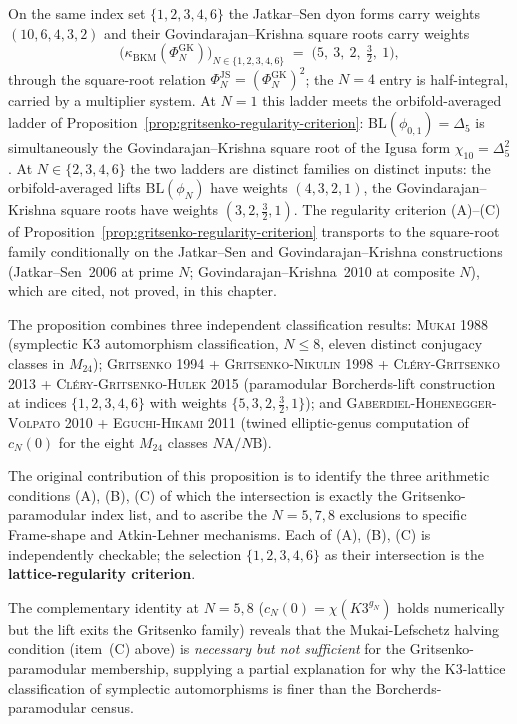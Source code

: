 \begin{corollary}
\label{cor:gritsenko-regularity-sqrt-transport}
On the same index set $\{1, 2, 3, 4, 6\}$ the Jatkar--Sen dyon forms
carry weights $(10, 6, 4, 3, 2)$ and their Govindarajan--Krishna
square roots carry weights
\[
 \bigl(\kappa_{\mathrm{BKM}}(\Phi_N^{\mathrm{GK}})\bigr)_{N \in \{1,2,3,4,6\}}
 \;=\; \bigl(5,\ 3,\ 2,\ \tfrac32,\ 1\bigr),
\]
through the square-root relation
$\Phi_N^{\mathrm{JS}} = (\Phi_N^{\mathrm{GK}})^2$; the $N = 4$ entry
is half-integral, carried by a multiplier system. At $N = 1$ this
ladder meets the orbifold-averaged ladder of
Proposition~\ref{prop:gritsenko-regularity-criterion}:
$\mathrm{BL}(\phi_{0,1}) = \Delta_5$ is simultaneously the
Govindarajan--Krishna square root of the Igusa form
$\chi_{10} = \Delta_5^2$. At $N \in \{2, 3, 4, 6\}$ the two ladders
are distinct families on distinct inputs: the orbifold-averaged
lifts $\mathrm{BL}(\phi_N)$ have weights $(4, 3, 2, 1)$, the
Govindarajan--Krishna square roots have weights
$(3, 2, \tfrac32, 1)$. The regularity criterion (A)--(C) of
Proposition~\ref{prop:gritsenko-regularity-criterion} transports to
the square-root family conditionally on the Jatkar--Sen and
Govindarajan--Krishna constructions (Jatkar--Sen~2006 at prime $N$;
Govindarajan--Krishna~2010 at composite $N$), which are cited, not
proved, in this chapter.
\end{corollary}

\begin{remark}
\label{rem:gritsenko-regularity-attribution}
The proposition combines three independent classification results:
\textsc{Mukai 1988} \textup{(symplectic K3 automorphism classification,
$N \le 8$, eleven distinct conjugacy classes in $M_{24}$);}
\textsc{Gritsenko 1994 + Gritsenko-Nikulin 1998 + Cl\'ery-Gritsenko 2013
+ Cl\'ery-Gritsenko-Hulek 2015} \textup{(paramodular Borcherds-lift
construction at indices $\{1, 2, 3, 4, 6\}$ with weights
$\{5, 3, 2, \tfrac32, 1\}$);} and \textsc{Gaberdiel-Hohenegger-Volpato 2010 +
Eguchi-Hikami 2011} \textup{(twined elliptic-genus computation of
$c_N(0)$ for the eight $M_{24}$ classes $N\mathrm{A}/N\mathrm{B}$).}

The original contribution of this proposition is to identify the three
arithmetic conditions (A), (B), (C) of which the intersection is
exactly the Gritsenko-paramodular index list, and to ascribe the
$N = 5, 7, 8$ exclusions to specific Frame-shape and Atkin-Lehner
mechanisms. Each of (A), (B), (C) is independently checkable; the
selection $\{1, 2, 3, 4, 6\}$ as their intersection is the
\textbf{lattice-regularity criterion}.

The complementary identity at $N = 5, 8$ ($c_N(0) = \chi(K3^{g_N})$
holds numerically but the lift exits the Gritsenko family) reveals
that the Mukai-Lefschetz halving condition (item~(C) above) is
\emph{necessary but not sufficient} for the Gritsenko-paramodular
membership, supplying a partial explanation for why the K3-lattice
classification of symplectic automorphisms is finer than the
Borcherds-paramodular census.
\end{remark}

